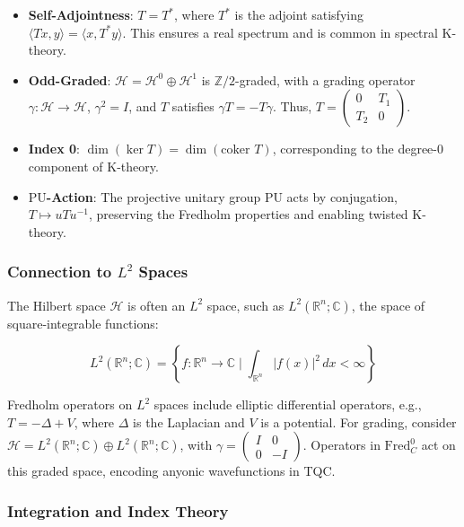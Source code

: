 \documentclass{article}
\theoremstyle{definition}
\begin{document}
\begin{itemize}
    \item \textbf{Self-Adjointness}: \(T = T^*\), where \(T^*\) is the adjoint satisfying \(\langle T x, y \rangle = \langle x, T^* y \rangle\). This ensures a real spectrum and is common in spectral K-theory.
    \item \textbf{Odd-Graded}: \(\mathscr{H} = \mathscr{H}^0 \oplus \mathscr{H}^1\) is \(\mathbb{Z}/2\)-graded, with a grading operator \(\gamma: \mathscr{H} \to \mathscr{H}\), \(\gamma^2 = I\), and \(T\) satisfies \(\gamma T = -T \gamma\). Thus, \(T = \begin{pmatrix} 0 & T_1 \\ T_2 & 0 \end{pmatrix}\).
    \item \textbf{Index 0}: \(\dim(\ker T) = \dim(\text{coker } T)\), corresponding to the degree-0 component of K-theory.
    \item \textbf{\(\mathrm{PU}\)-Action}: The projective unitary group \(\mathrm{PU}\) acts by conjugation, \(T \mapsto u T u^{-1}\), preserving the Fredholm properties and enabling twisted K-theory.
\end{itemize}

\subsubsection{Connection to \(L^2\) Spaces}

The Hilbert space \(\mathscr{H}\) is often an \(L^2\) space, such as \(L^2(\mathbb{R}^n; \mathbb{C})\), the space of square-integrable functions:

\[
L^2(\mathbb{R}^n; \mathbb{C}) = \left\{ f: \mathbb{R}^n \to \mathbb{C} \mid \int_{\mathbb{R}^n} |f(x)|^2 \, dx < \infty \right\}
\]

Fredholm operators on \(L^2\) spaces include elliptic differential operators, e.g., \(T = -\Delta + V\), where \(\Delta\) is the Laplacian and \(V\) is a potential. For grading, consider \(\mathscr{H} = L^2(\mathbb{R}^n; \mathbb{C}) \oplus L^2(\mathbb{R}^n; \mathbb{C})\), with \(\gamma = \begin{pmatrix} I & 0 \\ 0 & -I \end{pmatrix}\). Operators in \(\text{Fred}^0_C\) act on this graded space, encoding anyonic wavefunctions in TQC.

\subsubsection{Integration and Index Theory}
\end{document}
